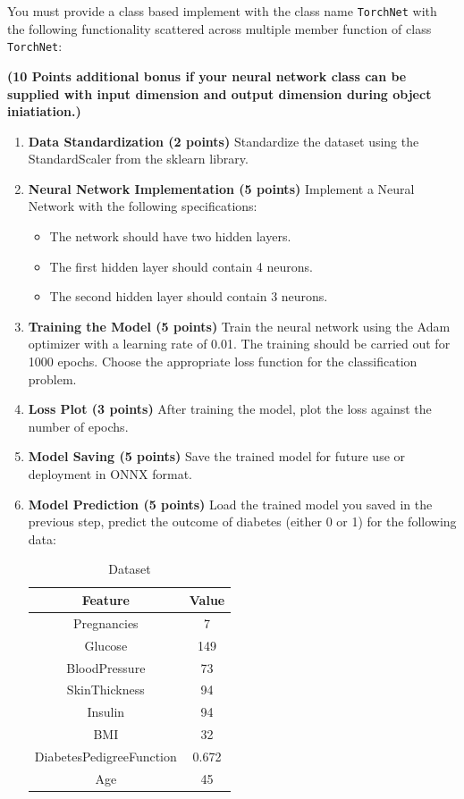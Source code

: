 \documentclass[12pt, xcolor=dvipsnames,svgnames,x11names]{article}
\begin{document}
You must provide a class based implement with the class name \texttt{TorchNet} with the following functionality scattered across multiple member function of class \texttt{TorchNet}:


\textbf{(10 Points additional bonus if your neural network class can be supplied with input dimension and output dimension during object iniatiation.)}

\begin{enumerate}
    \item  \textbf{Data Standardization \textbf{(2 points)}} Standardize the dataset using the StandardScaler from the sklearn library.
    \item \textbf{Neural Network Implementation \textbf{(5 points)}} Implement a Neural Network with the following specifications:

    \begin{itemize}
        \item  The network should have two hidden layers.
        \item  The first hidden layer should contain 4 neurons.
        \item  The second hidden layer should contain 3 neurons.
    \end{itemize}

    \item \textbf{Training the Model \textbf{(5 points)}} Train the neural network using the Adam optimizer with a learning rate of 0.01. The training should be carried out for 1000 epochs. Choose the appropriate loss function for the classification problem.    
    \item \textbf{Loss Plot \textbf{(3 points)}} After training the model, plot the loss against the number of epochs.
    \item \textbf{Model Saving \textbf{(5 points)}} Save the trained model for future use or deployment in ONNX format.

    \item \textbf{Model Prediction \textbf{(5 points)}} Load the trained model you saved in the previous step, predict the outcome of diabetes (either 0 or 1) for the following data:



    \begin{table}[h]
    \centering
    \begin{tabular}{|c|c|}
    \hline
    \textbf{Feature} & \textbf{Value} \\
    \hline
    Pregnancies & 7 \\ \hline
    Glucose & 149 \\ \hline
    BloodPressure & 73 \\ \hline
    SkinThickness & 94 \\ \hline
    Insulin & 94 \\ \hline
    BMI & 32 \\ \hline
    DiabetesPedigreeFunction & 0.672 \\ \hline
    Age & 45 \\ 
    \hline
    \end{tabular}
    \caption{Dataset}
    \end{table}
    
\end{enumerate}
\end{document}
